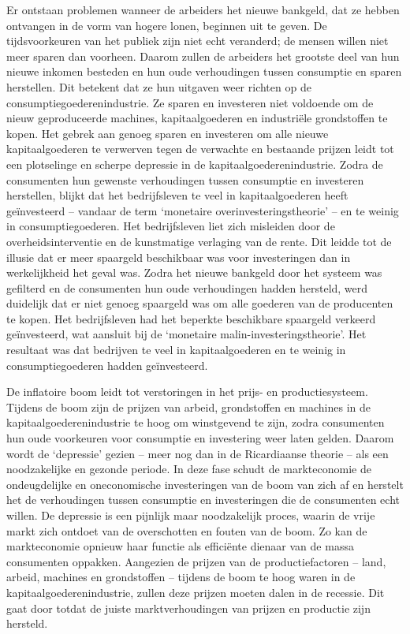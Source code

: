 \documentclass[
  a5paper,
  smalldemyvopaper,10pt,twoside,onecolumn,openright,extrafontsizes,hidelinks]{memoir}
\begin{document}
Er ontstaan problemen wanneer de arbeiders het nieuwe bankgeld, dat ze
hebben ontvangen in de vorm van hogere lonen, beginnen uit te geven. De
tijdsvoorkeuren van het publiek zijn niet echt veranderd; de mensen
willen niet meer sparen dan voorheen. Daarom zullen de arbeiders het
grootste deel van hun nieuwe inkomen besteden en hun oude verhoudingen
tussen consumptie en sparen herstellen. Dit betekent dat ze hun uitgaven
weer richten op de consumptiegoederenindustrie. Ze sparen en investeren
niet voldoende om de nieuw geproduceerde machines, kapitaalgoederen en
industriële grondstoffen te kopen. Het gebrek aan genoeg sparen en
investeren om alle nieuwe kapitaalgoederen te verwerven tegen de
verwachte en bestaande prijzen leidt tot een plotselinge en scherpe
depressie in de kapitaalgoederenindustrie. Zodra de consumenten hun
gewenste verhoudingen tussen consumptie en investeren herstellen, blijkt
dat het bedrijfsleven te veel in kapitaalgoederen heeft geïnvesteerd --
vandaar de term `monetaire overinvesteringstheorie' -- en te weinig in
consumptiegoederen. Het bedrijfsleven liet zich misleiden door de
overheidsinterventie en de kunstmatige verlaging van de rente. Dit
leidde tot de illusie dat er meer spaargeld beschikbaar was voor
investeringen dan in werkelijkheid het geval was. Zodra het nieuwe
bankgeld door het systeem was gefilterd en de consumenten hun oude
verhoudingen hadden hersteld, werd duidelijk dat er niet genoeg
spaargeld was om alle goederen van de producenten te kopen. Het
bedrijfsleven had het beperkte beschikbare spaargeld verkeerd
geïnvesteerd, wat aansluit bij de `monetaire malin-investeringstheorie'.
Het resultaat was dat bedrijven te veel in kapitaalgoederen en te weinig
in consumptiegoederen hadden geïnvesteerd.

De inflatoire boom leidt tot verstoringen in het prijs- en
productiesysteem. Tijdens de boom zijn de prijzen van arbeid,
grondstoffen en machines in de kapitaalgoederenindustrie te hoog om
winstgevend te zijn, zodra consumenten hun oude voorkeuren voor
consumptie en investering weer laten gelden. Daarom wordt de `depressie'
gezien -- meer nog dan in de Ricardiaanse theorie -- als een
noodzakelijke en gezonde periode. In deze fase schudt de markteconomie
de ondeugdelijke en oneconomische investeringen van de boom van zich af
en herstelt het de verhoudingen tussen consumptie en investeringen die
de consumenten echt willen. De depressie is een pijnlijk maar
noodzakelijk proces, waarin de vrije markt zich ontdoet van de
overschotten en fouten van de boom. Zo kan de markteconomie opnieuw haar
functie als efficiënte dienaar van de massa consumenten oppakken.
Aangezien de prijzen van de productiefactoren -- land, arbeid, machines
en grondstoffen -- tijdens de boom te hoog waren in de
kapitaalgoederenindustrie, zullen deze prijzen moeten dalen in de
recessie. Dit gaat door totdat de juiste marktverhoudingen van prijzen
en productie zijn hersteld.
\end{document}
